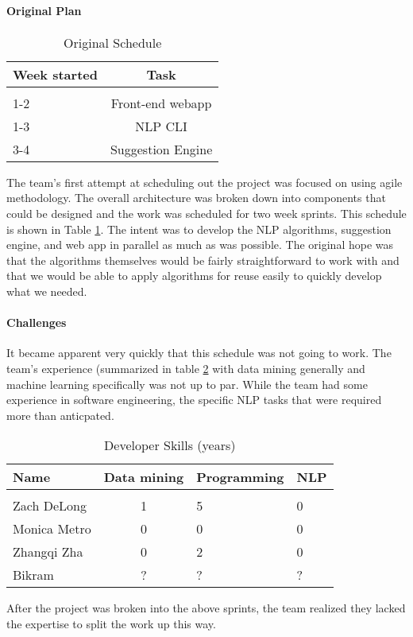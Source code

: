 
\paragraph{Original Plan}
\begin{table}[h]
\begin{center}
    \caption{Original Schedule}
    \begin{tabular}{ l c }
    \bf Week started & \bf Task \\ \hline \\
    1-2 & Front-end webapp  \\
    1-3 & NLP CLI  \\
    3-4 & Suggestion Engine 
    \end{tabular} \label{sec:devi-from-init-pln:original-timeline}
\end{center}
\end{table}

The team's first attempt at scheduling out the project was focused on
using agile methodology.  
The overall architecture was broken down into components that could be
designed and the work was scheduled for two week sprints.
This schedule is shown in Table
\ref{sec:devi-from-init-pln:original-timeline}.
The intent was to develop the NLP algorithms, suggestion engine, and
web app in parallel as much as was possible.
The original hope was that the algorithms themselves would be fairly
straightforward to work with and that we would be able to apply
algorithms for reuse easily to quickly develop what we needed.

\paragraph{Challenges}
It became apparent very quickly that this schedule was not going to
work.
The team's experience (summarized in table
\ref{sec:devi-from-init-pln:skillsets} with data mining generally and
machine learning specifically was not up to par.
While the team had some experience in software engineering, the
specific NLP tasks that were required more than anticpated.

\begin{table}[h]
    \caption{Developer Skills (years)}
    \begin{tabular}{ l c l l}
    \bf Name & \bf Data mining & \bf Programming & \bf NLP\\ \hline \\
    Zach DeLong & 1 & 5 & 0 \\
    Monica Metro &  0 & 0 & 0 \\
    Zhangqi Zha & 0 & 2 & 0\\
    Bikram & ? & ? & ?  
    \end{tabular} \label{sec:devi-from-init-pln:skillsets}
\end{table}

After the project was broken into the above sprints, the team realized
they lacked the expertise to split the work up this way.



